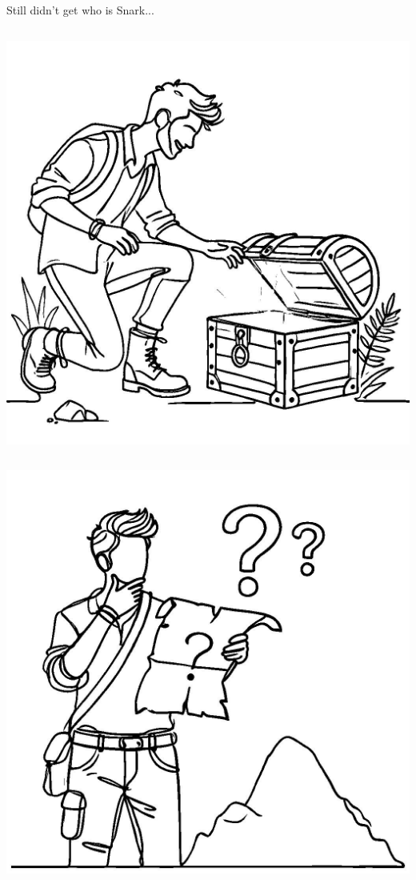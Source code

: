 \documentclass{beamer}
\begin{document}
\begin{frame}{Still didn't get who is Snark...}
\begin{columns}
            \begin{column}{0.2\textwidth}
                \includegraphics[width=\linewidth]{../presentations/images/lecture_8/uvefoundtreasure.jpg}
            \end{column}
        \end{columns}

        \pause

        \begin{columns}
            \begin{column}{0.2\textwidth}
                \includegraphics[width=\linewidth]{../presentations/images/lecture_8/howtomakeaproof.jpg}
            \end{column}


\end{columns}
\end{frame}
\end{document}
